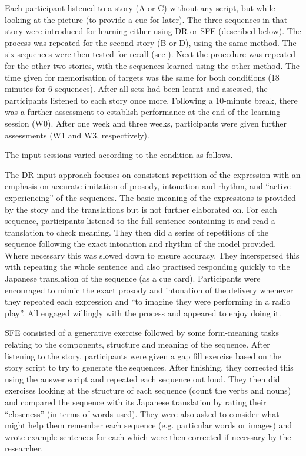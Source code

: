 \documentclass[output=paper]{langscibook}
\begin{document}
Each participant listened to a story (A or C) without any script, but while looking at the picture (to provide a cue for later). The three sequences in that story were introduced for learning either using DR or SFE (described below). The process was repeated for the second story (B or D), using the same method. The six sequences were then tested for recall (see ). Next the procedure was repeated for the other two stories, with the sequences learned using the other method. The time given for memorisation of targets was the same for both conditions (18 minutes for 6 sequences). After all sets had been learnt and assessed, the participants listened to each story once more. Following a 10-minute break, there was a further assessment to establish performance at the end of the learning session (W0). After one week and three weeks, participants were given further assessments (W1 and W3, respectively).

The input sessions varied according to the condition as follows.


The DR input approach focuses on consistent repetition of the expression with an emphasis on accurate imitation of prosody, intonation and rhythm, and ``active experiencing'' of the sequences. The basic meaning of the expressions is provided by the story and the translations but is not further elaborated on. For each sequence, participants listened to the full sentence containing it and read a translation to check meaning. They then did a series of repetitions of the sequence following the exact intonation and rhythm of the model provided. Where necessary this was slowed down to ensure accuracy. They interspersed this with repeating the whole sentence and also practised responding quickly to the Japanese translation of the sequence (as a cue card). Participants were encouraged to mimic the exact prosody and intonation of the delivery whenever they repeated each expression and “to imagine they were performing in a radio play”. All engaged willingly with the process and appeared to enjoy doing it.


SFE consisted of a generative exercise followed by some form-meaning tasks relating to the components, structure and meaning of the sequence. After listening to the story, participants were given a gap fill exercise based on the story script to try to generate the sequences. After finishing, they corrected this using the answer script and repeated each sequence out loud. They then did exercises looking at the structure of each sequence (count the verbs and nouns) and compared the sequence with its Japanese translation by rating their ``closeness'' (in terms of words used). They were also asked to consider what might help them remember each sequence (e.g. particular words or images) and wrote example sentences for each which were then corrected if necessary by the researcher.
\end{document}
